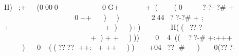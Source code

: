 H);  +         (0000     0G++((0 ?-?- ? #%
+            0+ +))244??-? #%
+
  ;
+          
  +))+)H((??-? %
        +)+
  +)))04 ((??- #%
+:+   ++
)0 ((???? %
++:      +
++))+ 04??  #%
) 0(???- %

